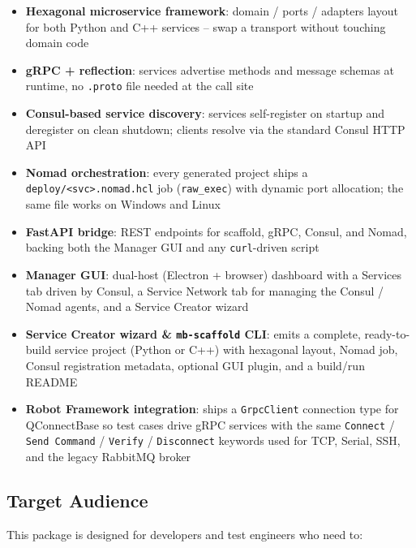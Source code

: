 \begin{itemize}
   \item \textbf{Hexagonal microservice framework}: domain / ports / adapters layout for
         both Python and C++ services -- swap a transport without touching domain code
   \item \textbf{gRPC + reflection}: services advertise methods and message schemas at
         runtime, no \texttt{.proto} file needed at the call site
   \item \textbf{Consul-based service discovery}: services self-register on startup and
         deregister on clean shutdown; clients resolve via the standard Consul HTTP API
   \item \textbf{Nomad orchestration}: every generated project ships a
         \texttt{deploy/<svc>.nomad.hcl} job (\texttt{raw\_exec}) with dynamic port
         allocation; the same file works on Windows and Linux
   \item \textbf{FastAPI bridge}: REST endpoints for scaffold, gRPC, Consul, and Nomad,
         backing both the Manager GUI and any \texttt{curl}-driven script
   \item \textbf{Manager GUI}: dual-host (Electron + browser) dashboard with a Services
         tab driven by Consul, a Service Network tab for managing the Consul / Nomad
         agents, and a Service Creator wizard
   \item \textbf{Service Creator wizard \& \texttt{mb-scaffold} CLI}: emits a complete,
         ready-to-build service project (Python or C++) with hexagonal layout, Nomad
         job, Consul registration metadata, optional GUI plugin, and a build/run README
   \item \textbf{Robot Framework integration}: ships a \texttt{GrpcClient} connection
         type for QConnectBase so test cases drive gRPC services with the same
         \texttt{Connect} / \texttt{Send Command} / \texttt{Verify} / \texttt{Disconnect}
         keywords used for TCP, Serial, SSH, and the legacy RabbitMQ broker
\end{itemize}

\subsection{Target Audience}

This package is designed for developers and test engineers who need to:

